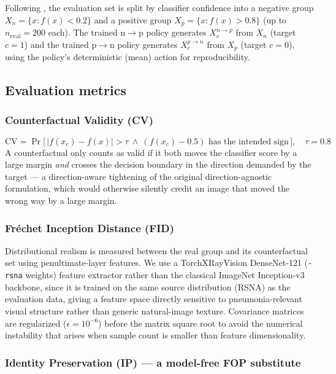 \documentclass[11pt]{article}
\begin{document}
Following \cite{singla2022}, the evaluation set is split by classifier
confidence into a negative group $X_n = \{x : f(x) < 0.2\}$ and a positive
group $X_p = \{x : f(x) > 0.8\}$ (up to $n_{\text{eval}}=200$ each). The
trained n$\to$p policy generates $X_c^{n \to p}$ from $X_n$ (target $c=1$)
and the trained p$\to$n policy generates $X_c^{p \to n}$ from $X_p$
(target $c=0$), using the policy's deterministic (mean) action for
reproducibility.

\subsection{Evaluation metrics}

\subsubsection{Counterfactual Validity (CV)}

\[
  \mathrm{CV} = \Pr\big[\, |f(x_c) - f(x)| > \tau \ \wedge\ (f(x_c) - 0.5)
  \text{ has the intended sign} \,\big], \quad \tau = 0.8
\]
A counterfactual only counts as valid if it both moves the classifier
score by a large margin \emph{and} crosses the decision boundary in the
direction demanded by the target — a direction-aware tightening of the
original direction-agnostic formulation, which would otherwise silently
credit an image that moved the wrong way by a large margin.

\subsubsection{Fr\'echet Inception Distance (FID)}

Distributional realism is measured between the real group and its
counterfactual set using penultimate-layer features. We use a
TorchXRayVision DenseNet-121 (\texttt{-rsna} weights) feature extractor
rather than the classical ImageNet Inception-v3 backbone, since it is
trained on the same source distribution (RSNA) as the evaluation data,
giving a feature space directly sensitive to pneumonia-relevant visual
structure rather than generic natural-image texture. Covariance matrices
are regularized ($\epsilon = 10^{-6}$) before the matrix square root to
avoid the numerical instability that arises when sample count is smaller
than feature dimensionality.

\subsubsection{Identity Preservation (IP) — a model-free FOP substitute}
\label{sec:ip}
\end{document}

